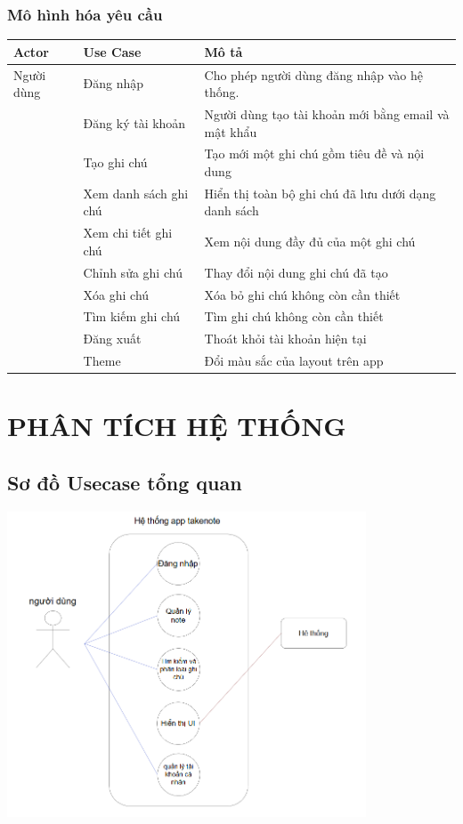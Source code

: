 \documentclass[a4paper,12pt]{article}
\begin{document}
\subsubsection{Mô hình hóa yêu cầu}
\begin{longtable}{|>{\raggedright}p{3cm}|>{\raggedright}p{4cm}|>{\raggedright}p{7cm}|}
\hline
\textbf{Actor} & \textbf{Use Case} & \textbf{Mô tả} \\ \hline
Người dùng & Đăng nhập & Cho phép người dùng đăng nhập vào hệ thống. \\ \hline
& Đăng ký tài khoản & Người dùng tạo tài khoản mới bằng email và mật khẩu \\ \hline
& Tạo ghi chú & Tạo mới một ghi chú gồm tiêu đề và nội dung \\ \hline
& Xem danh sách ghi chú & Hiển thị toàn bộ ghi chú đã lưu dưới dạng danh sách \\ \hline
& Xem chi tiết ghi chú & Xem nội dung đầy đủ của một ghi chú \\ \hline
& Chỉnh sửa ghi chú & Thay đổi nội dung ghi chú đã tạo \\ \hline
& Xóa ghi chú & Xóa bỏ ghi chú không còn cần thiết \\ \hline
& Tìm kiếm ghi chú & Tìm ghi chú không còn cần thiết \\ \hline
& Đăng xuất & Thoát khỏi tài khoản hiện tại \\ \hline
& Theme & Đổi màu sắc của layout trên app \\ \hline
\end{longtable}

\section{PHÂN TÍCH HỆ THỐNG}
\subsection{Sơ đồ Usecase tổng quan}
\includegraphics[width=0.8\textwidth]{useCaseTongQuan.png}
\end{document}
